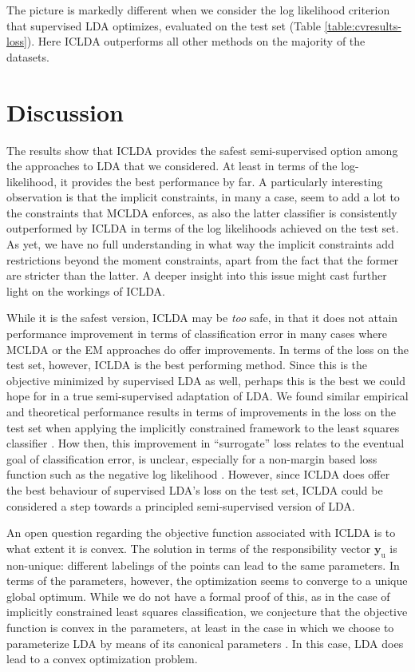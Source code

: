 \documentclass[twoside]{memoir}\usepackage[]{graphicx}\usepackage{xcolor}
\renewcommand{\cite}{\citep}
\begin{document}
The picture is markedly different when we consider the log likelihood criterion that supervised LDA optimizes, evaluated on the test set (Table \ref{table:cvresults-loss}). Here ICLDA outperforms all other methods on the majority of the datasets. 

\section{Discussion}
The results show that ICLDA provides the safest semi-supervised option among the approaches to LDA that we considered. At least in terms of the log-likelihood, it provides the best performance by far. A particularly interesting observation is that the implicit constraints, in many a case, seem to add a lot to the constraints that MCLDA enforces, as also the latter classifier is consistently outperformed by ICLDA in terms of the log likelihoods achieved on the test set. As yet, we have no full understanding in what way the implicit constraints add restrictions beyond the moment constraints, apart from the fact that the former are stricter than the latter.  A deeper insight into this issue might cast further light on the workings of ICLDA.

While it is the safest version, ICLDA may be \emph{too} safe, in that it does not attain performance improvement in terms of classification error in many cases where MCLDA or the EM approaches do offer improvements. In terms of the loss on the test set, however, ICLDA is the best performing method. Since this is the objective minimized by supervised LDA as well, perhaps this is the best we could hope for in a true semi-supervised adaptation of LDA. We found similar empirical and theoretical performance results in terms of improvements in the loss on the test set when applying the implicitly constrained framework to the least squares classifier \cite{Krijthe2015}. How then, this improvement in ``surrogate'' loss relates to the eventual goal of classification error, is unclear, especially for a non-margin based loss function such as the negative log likelihood \cite{Bartlett2006}. However, since ICLDA does offer the best behaviour of supervised LDA's loss on the test set, ICLDA could be considered a step towards a principled semi-supervised version of LDA.

An open question regarding the objective function associated with ICLDA is to what extent it is convex. The solution in terms of the responsibility vector $\mathbf{y}_\textrm{u}$ is non-unique: different labelings of the points can lead to the same parameters. In terms of the parameters, however, the optimization seems to converge to a unique global optimum. While we do not have a formal proof of this, as in the case of implicitly constrained least squares classification, we conjecture that the objective function is convex in the parameters, at least in the case in which we choose to parameterize LDA by means of its canonical parameters \cite{Lehmann1998}.  In this case, LDA does lead to a convex optimization problem.
\end{document}
